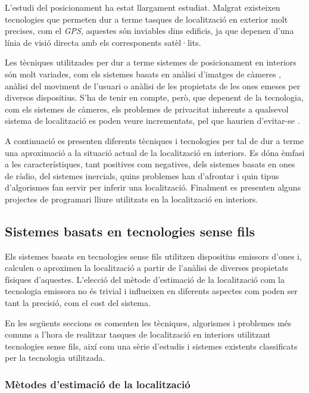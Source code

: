 
L’estudi del posicionament ha estat llargament estudiat. Malgrat existeixen tecnologies que permeten dur a terme tasques de localització en exterior molt precises, com el \textit{GPS}, aquestes són inviables dins edificis, ja que depenen d’una línia de visió directa amb els corresponents satèl·lits.

Les tècniques utilitzades per dur a terme sistemes de posicionament en interiors són molt variades, com els  sistemes basats en anàlisi d’imatges de càmeres \cite{martinez} \cite{mulloni}, anàlisi del moviment de l’usuari o anàlisi de les propietats de les ones emeses per diversos dispositius. S’ha de tenir en compte, però, que depenent de la tecnologia, com els sistemes de càmeres, els problemes de privacitat inherents a qualsevol sistema de localització es poden veure incrementats, pel que haurien d’evitar-se \cite{garcia}.

A continuació es presenten diferents tècniques i tecnologies per tal de dur a terme una aproximació a la situació actual de la localització en interiors. Es dóna èmfasi a les característiques, tant positives com negatives, dels sistemes basats en ones de ràdio, del sistemes inercials, quins problemes han d’afrontar i quin tipus d’algorismes fan servir per inferir una localització. Finalment es presenten alguns projectes de programari lliure utilitzats en la localització en interiors.

\subsection{Sistemes basats en tecnologies sense fils}

Els sistemes basats en tecnologies sense fils utilitzen dispositius emissors d'ones i, calculen o aproximen la localització a partir de l'anàlisi de diverses propietats físiques d'aquestes. L'elecció del mètode d'estimació de la localització com la tecnologia emissora no és trivial i influeixen en diferents aspectes com poden ser tant la precisió, com el cost del sistema.

En les següents seccions es comenten les tècniques, algorismes i problemes més comuns a l'hora de realitzar tasques de localització en interiors utilitzant tecnologies sense fils, així com una sèrie d'estudis i sistemes existents classificats per la tecnologia utilitzada. 

\subsubsection{Mètodes d’estimació de la localització}

